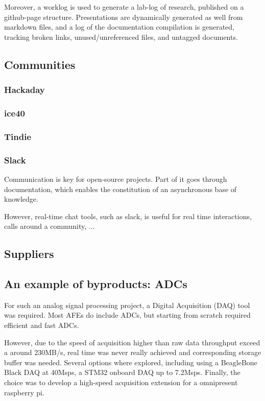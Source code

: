 \documentclass[conference]{IEEEtran}
\begin{document}
Moreover, a worklog is used to generate a lab-log of research, published on a github-page structure. Presentations are dynamically generated as well from markdown files, and a log of the documentation compilation is generated, tracking broken links, unused/unreferenced files, and untagged documents.


\subsection{Communities}

\subsubsection{Hackaday}

\subsubsection{ice40}

\subsubsection{Tindie}

\subsubsection{Slack}

Communication is key for open-source projects. Part of it goes through documentation, which enables the constitution of an asynchronous base of knowledge. 

However, real-time chat tools, such as slack, is useful for real time interactions, calls around a community, ...

\subsection{Suppliers}

\subsection{An example of byproducts: ADCs}

For such an analog signal processing project, a Digital Acquisition (DAQ) tool was required. Most AFEs do include ADCs, but starting from scratch required efficient and fast ADCs. 

However, due to the speed of acquisition higher than raw data throughput exceed a around 230MB/s, real time was never really achieved and corresponding storage buffer was needed. Several options where explored, including using a BeagleBone Black DAQ at 40Msps, a STM32 onboard DAQ up to 7.2Msps. Finally, the choice was to develop a high-speed acquisition extension for a omnipresent raspberry pi.
\end{document}
